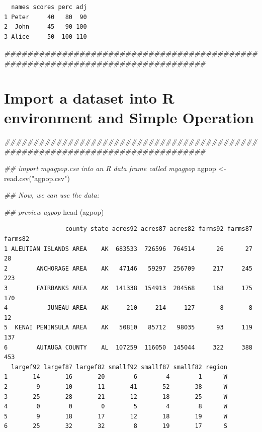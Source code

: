 \documentclass[
  letterpaper,
]{scrbook}
\newenvironment{Shaded}{\begin{snugshade}}{\end{snugshade}}
\newcommand{\DocumentationTok}[1]{\textcolor[rgb]{0.37,0.37,0.37}{\textit{#1}}}
\newcommand{\FunctionTok}[1]{\textcolor[rgb]{0.28,0.35,0.67}{#1}}
\newcommand{\NormalTok}[1]{\textcolor[rgb]{0.00,0.23,0.31}{#1}}
\newcommand{\OtherTok}[1]{\textcolor[rgb]{0.00,0.23,0.31}{#1}}
\newcommand{\StringTok}[1]{\textcolor[rgb]{0.13,0.47,0.30}{#1}}
\begin{document}
\begin{verbatim}
  names scores perc adj
1 Peter     40   80  90
2  John     45   90 100
3 Alice     50  100 110
\end{verbatim}

\begin{Shaded}
\begin{Highlighting}[]
\DocumentationTok{\#\#\#\#\#\#\#\#\#\#\#\#\#\#\#\#\#\#\#\#\#\#\#\#\#\#\#\#\#\#\#\#\#\#\#\#\#\#\#\#\#\#\#\#\#\#\#\#\#\#\#\#\#\#\#\#\#\#\#\#\#\#\#\#\#\#\#\#\#\#\#\#\#\#\#\#\#\#\#}
\end{Highlighting}
\end{Shaded}

\section{Import a dataset into R environment and Simple
Operation}\label{import-a-dataset-into-r-environment-and-simple-operation}

\begin{Shaded}
\begin{Highlighting}[]
\DocumentationTok{\#\#\#\#\#\#\#\#\#\#\#\#\#\#\#\#\#\#\#\#\#\#\#\#\#\#\#\#\#\#\#\#\#\#\#\#\#\#\#\#\#\#\#\#\#\#\#\#\#\#\#\#\#\#\#\#\#\#\#\#\#\#\#\#\#\#\#\#\#\#\#\#\#\#\#\#\#\#\#}

\DocumentationTok{\#\# import myagpop.csv into an R data frame called \textquotesingle{}myagpop\textquotesingle{}}
\NormalTok{agpop }\OtherTok{\textless{}{-}} \FunctionTok{read.csv}\NormalTok{(}\StringTok{"agpop.csv"}\NormalTok{)}

\DocumentationTok{\#\# Now, we can use the data:}

\DocumentationTok{\#\# preview agpop}
\FunctionTok{head}\NormalTok{ (agpop)}
\end{Highlighting}
\end{Shaded}

\begin{verbatim}
                 county state acres92 acres87 acres82 farms92 farms87 farms82
1 ALEUTIAN ISLANDS AREA    AK  683533  726596  764514      26      27      28
2        ANCHORAGE AREA    AK   47146   59297  256709     217     245     223
3        FAIRBANKS AREA    AK  141338  154913  204568     168     175     170
4           JUNEAU AREA    AK     210     214     127       8       8      12
5  KENAI PENINSULA AREA    AK   50810   85712   98035      93     119     137
6        AUTAUGA COUNTY    AL  107259  116050  145044     322     388     453
  largef92 largef87 largef82 smallf92 smallf87 smallf82 region
1       14       16       20        6        4        1      W
2        9       10       11       41       52       38      W
3       25       28       21       12       18       25      W
4        0        0        0        5        4        8      W
5        9       18       17       12       18       19      W
6       25       32       32        8       19       17      S
\end{verbatim}
\end{document}
